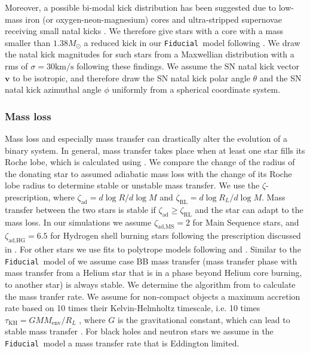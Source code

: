 \documentclass[a4paper,fleqn,usenatbib]{mnras}
\newcommand\Fiducial{\texttt{Fiducial }}
\begin{document}
Moreover, a possible bi-modal kick distribution has been suggested due to low-mass iron (or oxygen-neon-magnesium) cores and ultra-stripped supernovae receiving small natal kicks   
 \citep{katz1975two, arzoumanian2002velocity, pfahl2002population, podsiadlowski2004effects, knigge2011two,
 wongwathanarat2013three, beniamini2016formation, tauris2017formation, verbunt2017new}. 
We therefore give stars with a core with a mass smaller than  $1.38 M_{\odot}$ a reduced kick in our \Fiducial model following \citep{schwab2010further,knigge2011two}. We draw the natal kick magnitudes for such stars from a Maxwellian distribution with  a rms of 
$\sigma = 30 \mathrm{ km/s}$ following these findings. We assume  the SN natal kick vector $\mathbf{v}$  to be isotropic, and therefore draw the SN natal kick polar angle $\theta$ and the SN natal kick azimuthal angle $\phi$ uniformly from a spherical coordinate system. \\





\subsubsection{Mass loss}
Mass loss and especially mass transfer can drastically alter the evolution of a binary system. 
In general, mass transfer takes place when at least one star fills its Roche lobe, which is calculated using \citet{eggleton1983approximations}.  We compare the change of the radius of the donating star to assumed adiabatic mass loss with the change of its Roche lobe radius to determine stable or unstable mass transfer. We use the $\zeta$- prescription, where $\zeta_{\text{ad}} = d\log R / d\log M $ and $\zeta_{\text{RL}} = d\log R_L / d\log M $. Mass transfer between the two stars is stable if $\zeta_{\text{ad}} \geq \zeta_{\text{RL}}$ and the star can adapt to the mass loss. In our simulations we assume $\zeta_{\text{ad,MS}} = 2$ for Main Sequence stars, and  $\zeta_{\text{ad,HG}} = 6.5$ for Hydrogen shell burning stars following the prescription discussed in \citet{ge2010adiabatic,ge2015adiabatic}. For other stars we use fits to polytrope models following \citet{soberman1997stability} and \citet{hjellming1987thresholds}. Similar to the \Fiducial model of \citep{vigna2018formation} we assume case BB mass transfer (mass transfer phase with mass transfer from a Helium star that is in a phase beyond Helium core burning, to another star) is always stable. 
We determine the algorithm from  \citet{claeys2014theoretical} to calculate the mass tranfer rate. We  assume for non-compact objects a maximum accretion rate based on 10 times their Kelvin-Helmholtz timescale, i.e. 
10 times $\tau_{\text{KH}} = G M M_{\text{env}} / R_L$ , where $G$ is the gravitational constant, which can lead to stable mass transfer \citep{schneider2015evolution}. For black holes and neutron stars we assume in the \Fiducial model a mass transfer rate that is Eddington limited.
\end{document}
